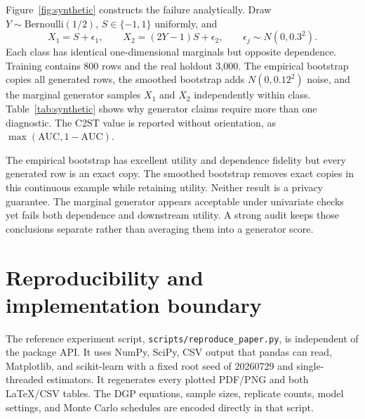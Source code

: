 \documentclass[10pt,twocolumn]{article}
\begin{document}
Figure~\ref{fig:synthetic} constructs the failure analytically. Draw \(Y\sim\mathrm{Bernoulli}(1/2)\), \(S\in\{-1,1\}\) uniformly, and
\[
  X_1=S+\epsilon_1,
  \qquad
  X_2=(2Y-1)S+\epsilon_2,
  \qquad
  \epsilon_j\sim N(0,0.3^2).
\]
Each class has identical one-dimensional marginals but opposite dependence. Training contains 800 rows and the real holdout 3,000. The empirical bootstrap copies all generated rows, the smoothed bootstrap adds \(N(0,0.12^2)\) noise, and the marginal generator samples \(X_1\) and \(X_2\) independently within class. Table~\ref{tab:synthetic} shows why generator claims require more than one diagnostic. The C2ST value is reported without orientation, as \(\max(\mathrm{AUC},1-\mathrm{AUC})\).

\begin{table}[t]
  \centering
  \small
  \caption{Synthetic-replica diagnostics. KS is the mean class-conditional feature statistic. Correlation error is the mean absolute class-conditional correlation difference. C2ST compares the joint \((X,Y)\) distribution. TSTR is real-holdout accuracy.}
  \label{tab:synthetic}
  \resizebox{0.93\textwidth}{!}{}
\end{table}

The empirical bootstrap has excellent utility and dependence fidelity but every generated row is an exact copy. The smoothed bootstrap removes exact copies in this continuous example while retaining utility. Neither result is a privacy guarantee. The marginal generator appears acceptable under univariate checks yet fails both dependence and downstream utility. A strong audit keeps those conclusions separate rather than averaging them into a generator score.

\section{Reproducibility and implementation boundary}

The reference experiment script, \texttt{scripts/reproduce\_paper.py}, is independent of the package API. It uses NumPy, SciPy, CSV output that pandas can read, Matplotlib, and scikit-learn with a fixed root seed of 20260729 and single-threaded estimators. It regenerates every plotted PDF/PNG and both LaTeX/CSV tables. The DGP equations, sample sizes, replicate counts, model settings, and Monte Carlo schedules are encoded directly in that script.
\end{document}
